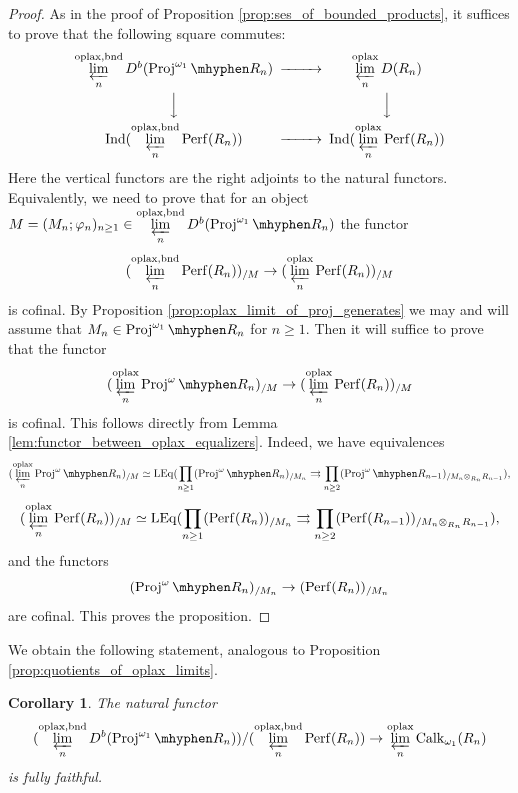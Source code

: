 \documentclass[11pt,leqno]{amsart}
\newtheorem{cor}[theo]{Corollary}
\numberwithin{equation}{section}
\newcommand{\tens}[1]{%
  \mathbin{\mathop{\otimes}\displaylimits_{#1}}%
}
\newcommand{\hy}{\mhyphen}
\newcommand{\prolim}[1][]{\mathop{\varprojlim}\limits_{#1}}
\newcommand{\prodd}[1][]{\mathop{\prod}\limits_{#1}}
\newcommand{\toto}{\rightrightarrows}
\newcommand{\bnd}{\operatorname{bnd}}
\newcommand{\oplax}{\operatorname{oplax}}
\newcommand{\Proj}{\operatorname{Proj}}
\newcommand{\LEq}{\operatorname{LEq}}
\newcommand{\Perf}{\operatorname{Perf}}
\newcommand{\Ind}{\operatorname{Ind}}
\newcommand{\Calk}{\operatorname{Calk}}
\begin{document}
\begin{proof}
As in the proof of Proposition \ref{prop:ses_of_bounded_products}, it suffices to prove that the following square commutes:
\begin{equation*}
\begin{CD}
\prolim[n]^{\oplax,\bnd} D^b(\Proj^{\omega_1}\hy R_n) @>>> \prolim[n]^{\oplax} D(R_n)\\
@VVV @VVV\\
\Ind(\prolim[n]^{\oplax,\bnd}\Perf(R_n)) @>>> \Ind(\prolim[n]^{\oplax}\Perf(R_n))
\end{CD}
\end{equation*}
Here the vertical functors are the right adjoints to the natural functors. Equivalently, we need to prove that for an object $M=(M_n;\varphi_n)_{n\geq 1}\in \prolim[n]^{\oplax,\bnd} D^b(\Proj^{\omega_1}\hy R_n)$ the functor
\begin{equation*}
(\prolim[n]^{\oplax,\bnd}\Perf(R_n))_{/M}\to (\prolim[n]^{\oplax}\Perf(R_n))_{/M}
\end{equation*}
is cofinal. By Proposition \ref{prop:oplax_limit_of_proj_generates} we may and will assume that $M_n\in\Proj^{\omega_1}\hy R_n$ for $n\geq 1.$ Then it will suffice to prove that the functor
\begin{equation*}
(\prolim[n]^{\oplax}\Proj^{\omega}\hy R_n)_{/M}\to (\prolim[n]^{\oplax}\Perf(R_n))_{/M}
\end{equation*}
is cofinal. This follows directly from Lemma \ref{lem:functor_between_oplax_equalizers}. Indeed, we have equivalences
\begin{equation*}
(\prolim[n]^{\oplax}\Proj^{\omega}\hy R_n)_{/M}\simeq \LEq(\prodd[n\geq 1](\Proj^{\omega}\hy R_n)_{/M_n}\toto \prodd[n\geq 2](\Proj^{\omega}\hy R_{n-1})_{/M_n\tens{R_n}R_{n-1}}),
\end{equation*}
\begin{equation*}
(\prolim[n]^{\oplax}\Perf(R_n))_{/M}\simeq \LEq(\prodd[n\geq 1](\Perf(R_n))_{/M_n}\toto \prodd[n\geq 2](\Perf(R_{n-1}))_{/M_n\tens{R_n}R_{n-1}}),
\end{equation*}
and the functors
\begin{equation*}
(\Proj^{\omega}\hy R_n)_{/M_n}\to (\Perf(R_n))_{/M_n}
\end{equation*}
are cofinal. This proves the proposition.
\end{proof}

We obtain the following statement, analogous to Proposition \ref{prop:quotients_of_oplax_limits}.

\begin{cor}\label{cor:fully_faithful_bounded_oplax_into_Calkins}
The natural functor 
\begin{equation}\label{eq:fully_faithful_embedding_for_bounded_oplax}
(\prolim[n]^{\oplax,\bnd}D^b(\Proj^{\omega_1}\hy R_n))/(\prolim[n]^{\oplax,\bnd}\Perf(R_n))\to\prolim[n]^{\oplax}\Calk_{\omega_1}(R_n)
\end{equation} is fully faithful.
\end{cor}
\end{document}
